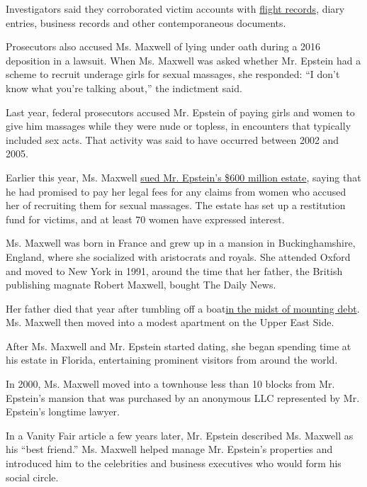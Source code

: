 Investigators said they corroborated victim accounts with
\href{https://www.nytimes.com/2019/07/26/nyregion/jeffrey-epstein-pilots.html}{flight
records}, diary entries, business records and other contemporaneous
documents.

Prosecutors also accused Ms. Maxwell of lying under oath during a 2016
deposition in a lawsuit. When Ms. Maxwell was asked whether Mr. Epstein
had a scheme to recruit underage girls for sexual massages, she
responded: ``I don't know what you're talking about,'' the indictment
said.

Last year, federal prosecutors accused Mr. Epstein of paying girls and
women to give him massages while they were nude or topless, in
encounters that typically included sex acts. That activity was said to
have occurred between 2002 and 2005.

Earlier this year, Ms. Maxwell
\href{https://www.nytimes.com/2020/03/18/business/jeffrey-epstein-ghislaine-maxwell-lawsuit.html}{sued
Mr. Epstein's \$600 million estate}, saying that he had promised to pay
her legal fees for any claims from women who accused her of recruiting
them for sexual massages. The estate has set up a restitution fund for
victims, and at least 70 women have expressed interest.

Ms. Maxwell was born in France and grew up in a mansion in
Buckinghamshire, England, where she socialized with aristocrats and
royals. She attended Oxford and moved to New York in 1991, around the
time that her father, the British publishing magnate Robert Maxwell,
bought The Daily News.

Her father died that year after tumbling off a
boat\href{https://www.nytimes.com/1991/12/20/business/maxwell-s-empire-it-grew-it-fell-special-report-charming-big-bankers-billions.html}{in
the midst of mounting debt}. Ms. Maxwell then moved into a modest
apartment on the Upper East Side.

After Ms. Maxwell and Mr. Epstein started dating, she began spending
time at his estate in Florida, entertaining prominent visitors from
around the world.

In 2000, Ms. Maxwell moved into a townhouse less than 10 blocks from Mr.
Epstein's mansion that was purchased by an anonymous LLC represented by
Mr. Epstein's longtime lawyer.

In a Vanity Fair article a few years later, Mr. Epstein described Ms.
Maxwell as his ``best friend.'' Ms. Maxwell helped manage Mr. Epstein's
properties and introduced him to the celebrities and business executives
who would form his social circle.

